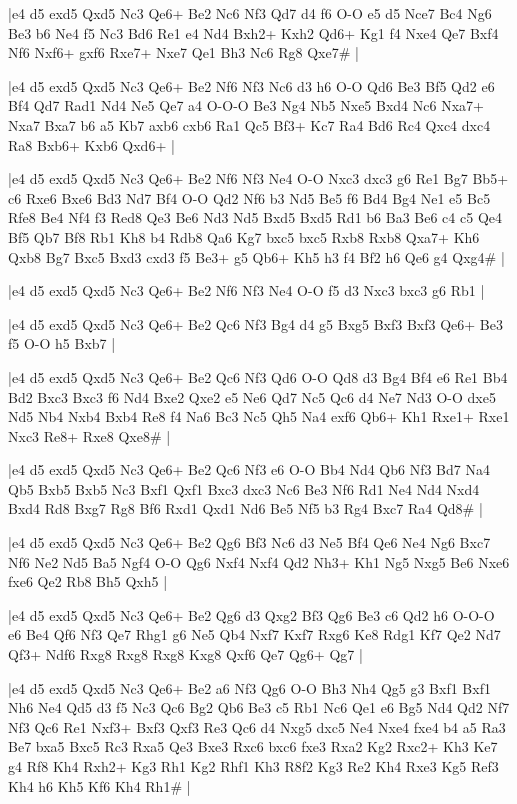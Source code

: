\whitename{}
\blackname{}
\makegametitle
|e4 d5 exd5 Qxd5 Nc3 Qe6+ Be2 Nc6 Nf3 Qd7 d4 f6 O-O e5 d5 Nce7 Bc4 Ng6 Be3 b6 Ne4 f5 Nc3 Bd6 Re1 e4 Nd4 Bxh2+ Kxh2 Qd6+ Kg1 f4 Nxe4 Qe7 Bxf4 Nf6 Nxf6+ gxf6 Rxe7+ Nxe7 Qe1 Bh3 Nc6 Rg8 Qxe7\#  |

\whitename{}
\blackname{}
\makegametitle
|e4 d5 exd5 Qxd5 Nc3 Qe6+ Be2 Nf6 Nf3 Nc6 d3 h6 O-O Qd6 Be3 Bf5 Qd2 e6 Bf4 Qd7 Rad1 Nd4 Ne5 Qe7 a4 O-O-O Be3 Ng4 Nb5 Nxe5 Bxd4 Nc6 Nxa7+ Nxa7 Bxa7 b6 a5 Kb7 axb6 cxb6 Ra1 Qc5 Bf3+ Kc7 Ra4 Bd6 Rc4 Qxc4 dxc4 Ra8 Bxb6+ Kxb6 Qxd6+  |

\whitename{}
\blackname{}
\makegametitle
|e4 d5 exd5 Qxd5 Nc3 Qe6+ Be2 Nf6 Nf3 Ne4 O-O Nxc3 dxc3 g6 Re1 Bg7 Bb5+ c6 Rxe6 Bxe6 Bd3 Nd7 Bf4 O-O Qd2 Nf6 b3 Nd5 Be5 f6 Bd4 Bg4 Ne1 e5 Bc5 Rfe8 Be4 Nf4 f3 Red8 Qe3 Be6 Nd3 Nd5 Bxd5 Bxd5 Rd1 b6 Ba3 Be6 c4 c5 Qe4 Bf5 Qb7 Bf8 Rb1 Kh8 b4 Rdb8 Qa6 Kg7 bxc5 bxc5 Rxb8 Rxb8 Qxa7+ Kh6 Qxb8 Bg7 Bxc5 Bxd3 cxd3 f5 Be3+ g5 Qb6+ Kh5 h3 f4 Bf2 h6 Qe6 g4 Qxg4\#  |

\whitename{}
\blackname{}
\makegametitle
|e4 d5 exd5 Qxd5 Nc3 Qe6+ Be2 Nf6 Nf3 Ne4 O-O f5 d3 Nxc3 bxc3 g6 Rb1  |

\whitename{}
\blackname{}
\makegametitle
|e4 d5 exd5 Qxd5 Nc3 Qe6+ Be2 Qc6 Nf3 Bg4 d4 g5 Bxg5 Bxf3 Bxf3 Qe6+ Be3 f5 O-O h5 Bxb7  |

\whitename{}
\blackname{}
\makegametitle
|e4 d5 exd5 Qxd5 Nc3 Qe6+ Be2 Qc6 Nf3 Qd6 O-O Qd8 d3 Bg4 Bf4 e6 Re1 Bb4 Bd2 Bxc3 Bxc3 f6 Nd4 Bxe2 Qxe2 e5 Ne6 Qd7 Nc5 Qc6 d4 Ne7 Nd3 O-O dxe5 Nd5 Nb4 Nxb4 Bxb4 Re8 f4 Na6 Bc3 Nc5 Qh5 Na4 exf6 Qb6+ Kh1 Rxe1+ Rxe1 Nxc3 Re8+ Rxe8 Qxe8\#  |

\whitename{}
\blackname{}
\makegametitle
|e4 d5 exd5 Qxd5 Nc3 Qe6+ Be2 Qc6 Nf3 e6 O-O Bb4 Nd4 Qb6 Nf3 Bd7 Na4 Qb5 Bxb5 Bxb5 Nc3 Bxf1 Qxf1 Bxc3 dxc3 Nc6 Be3 Nf6 Rd1 Ne4 Nd4 Nxd4 Bxd4 Rd8 Bxg7 Rg8 Bf6 Rxd1 Qxd1 Nd6 Be5 Nf5 b3 Rg4 Bxc7 Ra4 Qd8\#  |

\whitename{}
\blackname{}
\makegametitle
|e4 d5 exd5 Qxd5 Nc3 Qe6+ Be2 Qg6 Bf3 Nc6 d3 Ne5 Bf4 Qe6 Ne4 Ng6 Bxc7 Nf6 Ne2 Nd5 Ba5 Ngf4 O-O Qg6 Nxf4 Nxf4 Qd2 Nh3+ Kh1 Ng5 Nxg5 Be6 Nxe6 fxe6 Qe2 Rb8 Bh5 Qxh5  |

\whitename{}
\blackname{}
\makegametitle
|e4 d5 exd5 Qxd5 Nc3 Qe6+ Be2 Qg6 d3 Qxg2 Bf3 Qg6 Be3 c6 Qd2 h6 O-O-O e6 Be4 Qf6 Nf3 Qe7 Rhg1 g6 Ne5 Qb4 Nxf7 Kxf7 Rxg6 Ke8 Rdg1 Kf7 Qe2 Nd7 Qf3+ Ndf6 Rxg8 Rxg8 Rxg8 Kxg8 Qxf6 Qe7 Qg6+ Qg7  |

\whitename{}
\blackname{}
\makegametitle
|e4 d5 exd5 Qxd5 Nc3 Qe6+ Be2 a6 Nf3 Qg6 O-O Bh3 Nh4 Qg5 g3 Bxf1 Bxf1 Nh6 Ne4 Qd5 d3 f5 Nc3 Qc6 Bg2 Qb6 Be3 c5 Rb1 Nc6 Qe1 e6 Bg5 Nd4 Qd2 Nf7 Nf3 Qc6 Re1 Nxf3+ Bxf3 Qxf3 Re3 Qc6 d4 Nxg5 dxc5 Ne4 Nxe4 fxe4 b4 a5 Ra3 Be7 bxa5 Bxc5 Rc3 Rxa5 Qe3 Bxe3 Rxc6 bxc6 fxe3 Rxa2 Kg2 Rxc2+ Kh3 Ke7 g4 Rf8 Kh4 Rxh2+ Kg3 Rh1 Kg2 Rhf1 Kh3 R8f2 Kg3 Re2 Kh4 Rxe3 Kg5 Ref3 Kh4 h6 Kh5 Kf6 Kh4 Rh1\#  |

